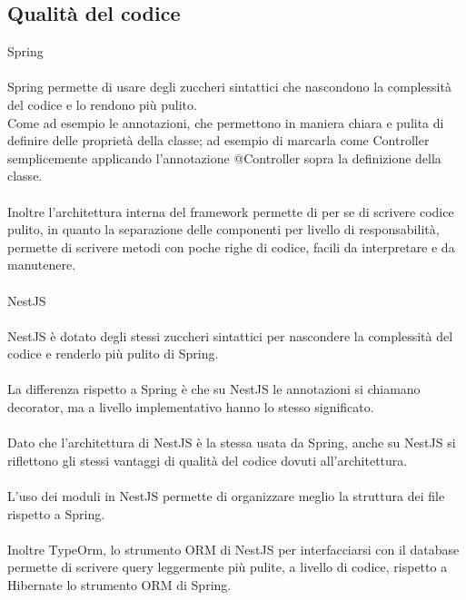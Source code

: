 \subsection{Qualità del codice}
Spring
\\\\
Spring permette di usare degli zuccheri sintattici che nascondono la complessità del codice e lo rendono più
pulito.
\\
Come ad esempio le annotazioni, che permettono in maniera chiara e pulita di definire delle proprietà della classe;
ad esempio di marcarla come Controller semplicemente applicando l'annotazione @Controller sopra la definizione della
classe.
\\\\
Inoltre l'architettura interna del framework permette di per se di scrivere codice pulito, in quanto la separazione delle
componenti per livello di responsabilità, permette di scrivere metodi con poche righe di codice, facili da interpretare e
da manutenere.
\\\\
NestJS
\\\\
NestJS è dotato degli stessi zuccheri sintattici per nascondere la complessità del codice e renderlo più pulito di Spring.
\\\\
La differenza rispetto a Spring è che su NestJS le annotazioni si chiamano decorator, ma a livello implementativo hanno lo 
stesso significato.
\\\\
Dato che l'architettura di NestJS è la stessa usata da Spring, anche su NestJS si riflettono gli stessi vantaggi di
qualità del codice dovuti all'architettura.
\\\\
L'uso dei moduli in NestJS permette di organizzare meglio la struttura dei file rispetto a Spring.
\\\\
Inoltre TypeOrm, lo strumento ORM di NestJS per interfacciarsi con il database permette di scrivere query leggermente più
pulite, a livello di codice, rispetto a Hibernate lo strumento ORM di Spring.

